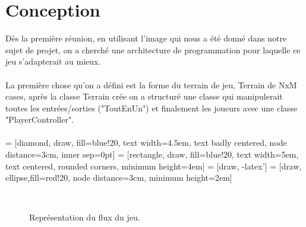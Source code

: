 \documentclass{article}
\begin{document}
\section{Conception}
Dès la première réunion, en utilisant l'image qui nous a été donné dans notre sujet de projet, on a cherché une architecture de programmation pour laquelle ce jeu s'adapterait au mieux.\\~\\
La première chose qu'on a défini est la forme du terrain de jeu, Terrain de NxM cases, après la classe Terrain crée on a structuré une classe qui manipulerait toutes les entrées/sorties ("ToutEnUn") et finalement les joueurs avec une classe "PlayerController".\\~\\
 = [diamond, draw, fill=blue!20, 
    text width=4.5em, text badly centered, node distance=3cm, inner sep=0pt]
 = [rectangle, draw, fill=blue!20, 
    text width=5em, text centered, rounded corners, minimum height=4em]
 = [draw, -latex']
 = [draw, ellipse,fill=red!20, node distance=3cm,
    minimum height=2em]
\begin{figure}[h]
\centering
{}~\\
\caption{Représentation du flux du jeu.}
\end{figure}
\newpage
\end{document}
